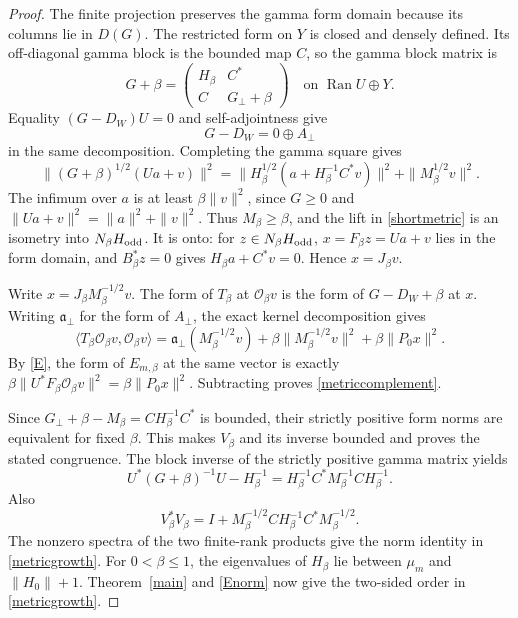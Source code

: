 \documentclass[11pt]{article}
\theoremstyle{remark}
\newcommand{\Ran}{\operatorname{Ran}}
\begin{document}
\begin{proof}
The finite projection preserves the gamma form domain because its
columns lie in \(D(G)\). The restricted form on \(Y\) is closed
and densely defined. Its off-diagonal gamma block is the bounded
map \(C\), so the gamma block matrix is
\[
 G+\beta=
 \begin{pmatrix}H_\beta&C^*\\ C&G_\perp+\beta\end{pmatrix}
           \quad\text{on }\Ran U\oplus Y.
\]
Equality \((G-D_W)U=0\) and self-adjointness give
\[
 G-D_W=0\oplus A_\perp
\]
in the same decomposition. Completing the gamma square gives
\[
 \|(G+\beta)^{1/2}(Ua+v)\|^2
 =\|H_\beta^{1/2}(a+H_\beta^{-1}C^*v)\|^2
                         +\|M_\beta^{1/2}v\|^2.
\]
The infimum over \(a\) is at least \(\beta\|v\|^2\), since
\(G\ge0\) and \(\|Ua+v\|^2=\|a\|^2+\|v\|^2\).
Thus \(M_\beta\ge\beta\), and the lift in
\eqref{shortmetric} is an isometry into \(N_\beta H_{\rm odd}\).
It is onto: for \(z\in N_\beta H_{\rm odd}\),
\(x=F_\beta z=Ua+v\) lies in the form domain, and
\(B_\beta^*z=0\) gives
\(H_\beta a+C^*v=0\). Hence \(x=J_\beta v\).

Write \(x=J_\beta M_\beta^{-1/2}v\). The form of \(T_\beta\)
at \(\mathcal O_\beta v\) is the form of \(G-D_W+\beta\) at \(x\).
Writing \(\mathfrak a_\perp\) for the form of \(A_\perp\),
the exact kernel decomposition gives
\[
 \langle T_\beta\mathcal O_\beta v,\mathcal O_\beta v\rangle
 =\mathfrak a_\perp(M_\beta^{-1/2}v)
                   +\beta\|M_\beta^{-1/2}v\|^2
                         +\beta\|P_0x\|^2.
\]
By \eqref{E}, the form of \(E_{m,\beta}\) at the same vector is
exactly \(\beta\|U^*F_\beta\mathcal O_\beta v\|^2
=\beta\|P_0x\|^2\).
Subtracting proves \eqref{metriccomplement}.

Since \(G_\perp+\beta-M_\beta=CH_\beta^{-1}C^*\) is bounded,
their strictly positive form norms are equivalent for fixed
\(\beta\). This makes \(V_\beta\) and its inverse bounded and
proves the stated congruence.
The block inverse of the strictly positive gamma matrix yields
\[
 U^*(G+\beta)^{-1}U-H_\beta^{-1}
           =H_\beta^{-1}C^*M_\beta^{-1}CH_\beta^{-1}.
\]
Also
\[
 V_\beta^*V_\beta
     =I+M_\beta^{-1/2}CH_\beta^{-1}C^*M_\beta^{-1/2}.
\]
The nonzero spectra of the two finite-rank products give the
norm identity in \eqref{metricgrowth}.
For \(0<\beta\le1\), the eigenvalues of \(H_\beta\) lie between
\(\mu_m\) and \(\|H_0\|+1\). Theorem~\ref{main} and
\eqref{Enorm} now give the two-sided order in
\eqref{metricgrowth}.
\end{proof}
\end{document}
